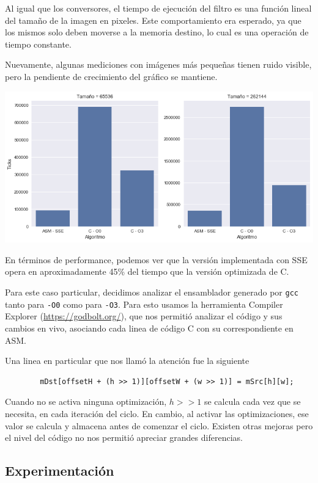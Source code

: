 Al igual que los conversores, el tiempo de ejecución del filtro es una función lineal del tamaño de la imagen en pixeles. Este comportamiento era esperado, ya que los mismos solo deben moverse a la memoria destino, lo cual es una operación de tiempo constante.

Nuevamente, algunas mediciones con imágenes más pequeñas tienen ruido visible, pero la pendiente de crecimiento del gráfico se mantiene.

\begin{center}
	\includegraphics[scale=0.5]{img/fourCombine_CvsASMvsO3_bars.png}
\end{center}

En términos de performance, podemos ver que la versión implementada con SSE opera en aproximadamente 45\% del tiempo que la versión optimizada de C.


Para este caso particular, decidimos analizar el ensamblador generado por \texttt{gcc} tanto para \texttt{-O0} como para \texttt{-O3}. Para esto usamos la herramienta Compiler Explorer (\url{https://godbolt.org/}), que nos permitió analizar el código y sus cambios en vivo, asociando cada linea de código C con su correspondiente en ASM.

Una linea en particular que nos llamó la atención fue la siguiente

\begin{lstlisting}
		mDst[offsetH + (h >> 1)][offsetW + (w >> 1)] = mSrc[h][w];
\end{lstlisting}

Cuando no se activa ninguna optimización, $h >> 1$ se calcula cada vez que se necesita, en cada iteración del ciclo. En cambio, al activar las optimizaciones, ese valor se calcula y almacena antes de comenzar el ciclo. Existen otras mejoras pero el nivel del código no nos permitió apreciar grandes diferencias.

\subsection{Experimentación}


